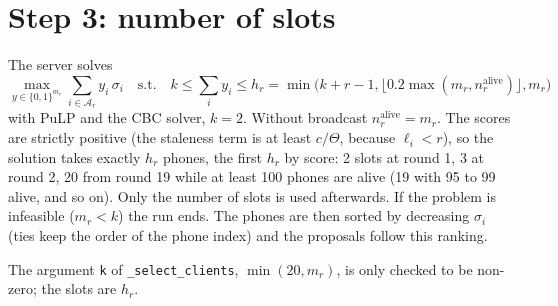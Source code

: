 \documentclass[11pt,a4paper]{article}
\newcommand{\cf}[1]{\texttt{#1}}
\begin{document}
\newpage
\section{Step 3: number of slots}
\label{sec:slots}

The server solves
\begin{equation}
  \max_{y \in \{0,1\}^{m_r}} \sum_{i \in \mathcal{A}_r} y_i \, \sigma_i
  \quad \text{s.t.} \quad
  k \le \sum_i y_i \le h_r = \min\bigl(k + r - 1, \lfloor 0.2 \max(m_r, n^{\mathrm{alive}}_r) \rfloor, m_r\bigr)
\end{equation}
with PuLP and the CBC solver, $k = 2$. Without broadcast $n^{\mathrm{alive}}_r =
m_r$. The scores are strictly positive (the staleness term is at least
$c / \Theta$, because $\ell_i < r$), so the solution takes exactly $h_r$ phones, the first $h_r$
by score: 2 slots at round 1, 3 at round 2, 20 from round 19 while at least
100 phones are alive (19 with 95 to 99 alive, and so on). Only the number of
slots is used afterwards. If the problem is infeasible ($m_r < k$) the run
ends. The phones are then sorted by decreasing $\sigma_i$ (ties keep the order
of the phone index) and the proposals follow this ranking.

The argument \cf{k} of \cf{\_select\_clients}, $\min(20, m_r)$, is only checked
to be non-zero; the slots are $h_r$.
\end{document}
